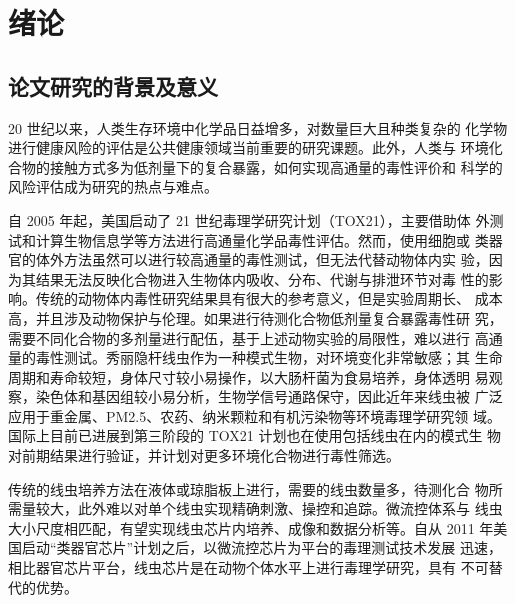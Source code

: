 
\chapter{绪论}
\label{chap:intro}

\section{论文研究的背景及意义}
\label{sec:intro:analog}
	20 世纪以来，人类生存环境中化学品日益增多，对数量巨大且种类复杂的
	化学物进行健康风险的评估是公共健康领域当前重要的研究课题。此外，人类与
	环境化合物的接触方式多为低剂量下的复合暴露，如何实现高通量的毒性评价和
	科学的风险评估成为研究的热点与难点。
	
		自 2005 年起，美国启动了 21 世纪毒理学研究计划（TOX21），主要借助体
	外测试和计算生物信息学等方法进行高通量化学品毒性评估。然而，使用细胞或
	类器官的体外方法虽然可以进行较高通量的毒性测试，但无法代替动物体内实
	验，因为其结果无法反映化合物进入生物体内吸收、分布、代谢与排泄环节对毒
	性的影响。传统的动物体内毒性研究结果具有很大的参考意义，但是实验周期长、
	成本高，并且涉及动物保护与伦理。如果进行待测化合物低剂量复合暴露毒性研
	究，需要不同化合物的多剂量进行配伍，基于上述动物实验的局限性，难以进行
	高通量的毒性测试。秀丽隐杆线虫作为一种模式生物，对环境变化非常敏感；其
	生命周期和寿命较短，身体尺寸较小易操作，以大肠杆菌为食易培养，身体透明
	易观察，染色体和基因组较小易分析，生物学信号通路保守，因此近年来线虫被
	广泛应用于重金属、PM2.5、农药、纳米颗粒和有机污染物等环境毒理学研究领
	域。国际上目前已进展到第三阶段的 TOX21 计划也在使用包括线虫在内的模式生
	物对前期结果进行验证，并计划对更多环境化合物进行毒性筛选。
	
		传统的线虫培养方法在液体或琼脂板上进行，需要的线虫数量多，待测化合
	物所需量较大，此外难以对单个线虫实现精确刺激、操控和追踪。微流控体系与
	线虫大小尺度相匹配，有望实现线虫芯片内培养、成像和数据分析等。自从 2011
	年美国启动“类器官芯片”计划之后，以微流控芯片为平台的毒理测试技术发展
	迅速，相比器官芯片平台，线虫芯片是在动物个体水平上进行毒理学研究，具有
	不可替代的优势。
	
